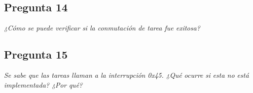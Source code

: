 \begin{minipage}{\linewidth}
	\subsection{Pregunta 14}
		\begin{minipage}{\linewidth}
			\textit{¿Cómo se puede verificar si la conmutación de tarea fue exitosa?}
			
			
		\end{minipage}
\end{minipage}

\begin{minipage}{\linewidth}
	\subsection{Pregunta 15}
		\begin{minipage}{\linewidth}
			\textit{Se sabe que las tareas llaman a la interrupción 0x45. ¿Qué ocurre si esta no está implementada? ¿Por qué?}
			
			
		\end{minipage}
\end{minipage}